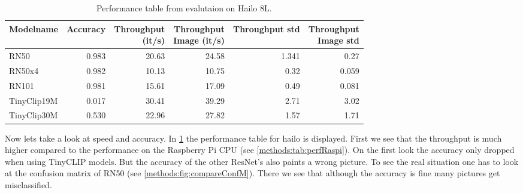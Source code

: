 \begin{table}[!h]
    \centering
    \begin{tabular}{l|rrrrr}
    \hline
    Modelname & Accuracy & \makecell{Throughput\\(it/s)} & \makecell{Throughput \\ Image (it/s)} & Throughput std & \makecell{Throughput\\Image std} \\ \hline
    RN50    & 0.983 & 20.63 & 24.58 & 1.341 & 0.27 \\ 
    RN50x4  & 0.982 & 10.13 & 10.75 & 0.32 & 0.059 \\ 
    RN101   & 0.981 & 15.61 & 17.09 & 0.49 & 0.081 \\
    TinyClip19M & 0.017 & 30.41 & 39.29 & 2.71 & 3.02 \\ 
    TinyClip30M & 0.530 & 22.96 & 27.82 & 1.57 & 1.71 \\ 
    \end{tabular}
    \label{methods:tab:perfHailo}
    \caption{Performance table from evalutaion on Hailo 8L.}
\end{table}

Now lets take a look at speed and accuracy.
In \cref{methods:tab:perfHailo} the performance table for hailo is displayed.
First we see that the throughput is much higher compared to the performance on the Raspberry Pi CPU (see \cref{methods:tab:perfRaspi}).
On the first look the accuracy only dropped when using TinyCLIP models.
But the accuracy of the other ResNet's also paints a wrong picture.
To see the real situation one has to look at the confusion matrix of RN50 (see \cref{methods:fig:compareConfM}).
There we see that although the accuracy is fine many pictures get misclassified.

